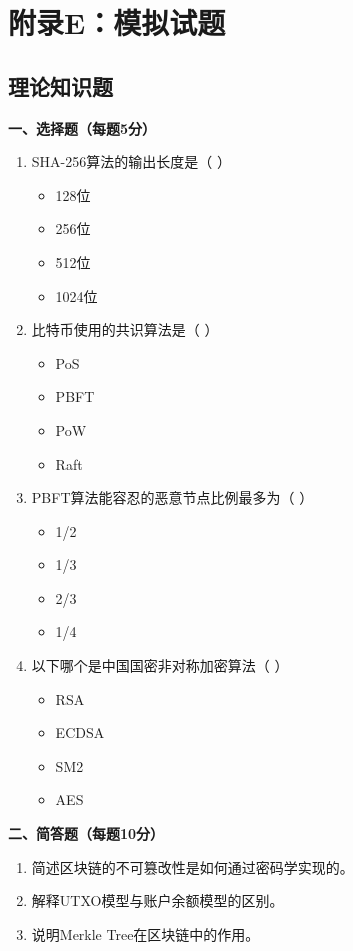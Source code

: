 ﻿\documentclass[12pt,a4paper]{article}
\begin{document}
\section{附录E：模拟试题}

\subsection{理论知识题}

\textbf{一、选择题（每题5分）}

\begin{enumerate}[leftmargin=1.5em]
\item SHA-256算法的输出长度是（ ）
  \begin{itemize}
  \item[A] 128位
  \item[B] 256位
  \item[C] 512位
  \item[D] 1024位
  \end{itemize}

\item 比特币使用的共识算法是（ ）
  \begin{itemize}
  \item[A] PoS
  \item[B] PBFT
  \item[C] PoW
  \item[D] Raft
  \end{itemize}

\item PBFT算法能容忍的恶意节点比例最多为（ ）
  \begin{itemize}
  \item[A] 1/2
  \item[B] 1/3
  \item[C] 2/3
  \item[D] 1/4
  \end{itemize}

\item 以下哪个是中国国密非对称加密算法（ ）
  \begin{itemize}
  \item[A] RSA
  \item[B] ECDSA
  \item[C] SM2
  \item[D] AES
  \end{itemize}
\end{enumerate}

\textbf{二、简答题（每题10分）}

\begin{enumerate}[leftmargin=1.5em]
\item 简述区块链的不可篡改性是如何通过密码学实现的。

\item 解释UTXO模型与账户余额模型的区别。

\item 说明Merkle Tree在区块链中的作用。
\end{enumerate}
\end{document}
